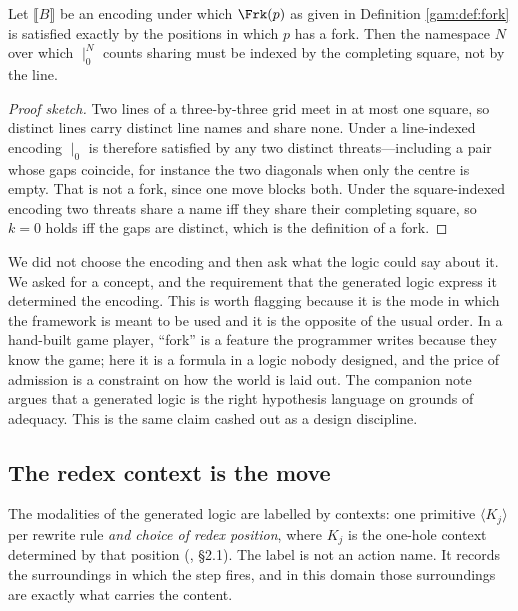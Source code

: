 \begin{proposition}\label{gam:prop:parands}
Let $\llbracket B \rrbracket$ be an encoding under which $\Frk(p)$ as given in
Definition \ref{gam:def:fork} is satisfied exactly by the positions in which $p$ has
a fork. Then the namespace $N$ over which $\mid_0^N$ counts sharing must be
indexed by the completing square, not by the line.
\end{proposition}
\begin{proof}[Proof sketch]
Two lines of a three-by-three grid meet in at most one square, so distinct lines
carry distinct line names and share none. Under a line-indexed encoding $\mid_0$
is therefore satisfied by any two distinct threats---including a pair whose gaps
coincide, for instance the two diagonals when only the centre is empty. That is
not a fork, since one move blocks both. Under the square-indexed encoding two
threats share a name iff they share their completing square, so $k=0$ holds iff
the gaps are distinct, which is the definition of a fork.
\end{proof}

\begin{remark}\label{gam:what-just-happened}
We did not choose the encoding and then ask what the logic could say about it.
We asked for a concept, and the requirement that the generated logic express it
determined the encoding. This is worth flagging because it is the mode in which
the framework is meant to be used and it is the opposite of the usual order. In
a hand-built game player, ``fork'' is a feature the programmer writes because
they know the game; here it is a formula in a logic nobody designed, and the
price of admission is a constraint on how the world is laid out. The companion
note argues that a generated logic is the right hypothesis language on grounds
of adequacy. This is the same claim cashed out as a design discipline.
\end{remark}

\subsection{The redex context is the move}\label{gam:sec:K}\label{gam:S4.1}

The modalities of the generated logic are labelled by contexts: one primitive
$\langle K_j\rangle$ per rewrite rule \emph{and choice of redex position}, where
$K_j$ is the one-hole context determined by that position
(\cite{ClassifierNote}, \S2.1). The label is not an action name. It records the
surroundings in which the step fires, and in this domain those surroundings are
exactly what carries the content.

